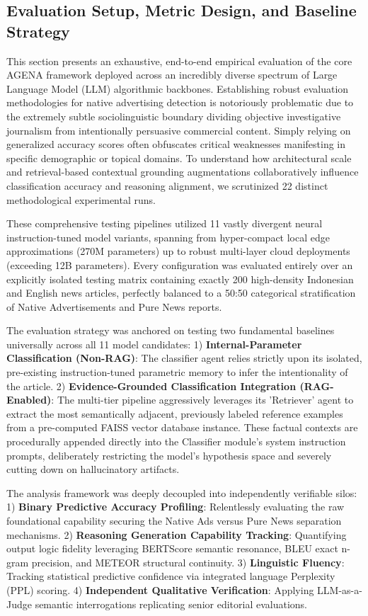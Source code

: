 \documentclass{ieeeaccess}
\begin{document}
\subsection{Evaluation Setup, Metric Design, and Baseline Strategy}
This section presents an exhaustive, end-to-end empirical evaluation of the core AGENA framework deployed across an incredibly diverse spectrum of Large Language Model (LLM) algorithmic backbones. Establishing robust evaluation methodologies for native advertising detection is notoriously problematic due to the extremely subtle sociolinguistic boundary dividing objective investigative journalism from intentionally persuasive commercial content. Simply relying on generalized accuracy scores often obfuscates critical weaknesses manifesting in specific demographic or topical domains. To understand how architectural scale and retrieval-based contextual grounding augmentations collaboratively influence classification accuracy and reasoning alignment, we scrutinized 22 distinct methodological experimental runs. 

These comprehensive testing pipelines utilized 11 vastly divergent neural instruction-tuned model variants, spanning from hyper-compact local edge approximations (270M parameters) up to robust multi-layer cloud deployments (exceeding 12B parameters). Every configuration was evaluated entirely over an explicitly isolated testing matrix containing exactly 200 high-density Indonesian and English news articles, perfectly balanced to a 50:50 categorical stratification of Native Advertisements and Pure News reports.

The evaluation strategy was anchored on testing two fundamental baselines universally across all 11 model candidates:
1) \textbf{Internal-Parameter Classification (Non-RAG)}: The classifier agent relies strictly upon its isolated, pre-existing instruction-tuned parametric memory to infer the intentionality of the article.
2) \textbf{Evidence-Grounded Classification Integration (RAG-Enabled)}: The multi-tier pipeline aggressively leverages its 'Retriever' agent to extract the most semantically adjacent, previously labeled reference examples from a pre-computed FAISS vector database instance. These factual contexts are procedurally appended directly into the Classifier module's system instruction prompts, deliberately restricting the model's hypothesis space and severely cutting down on hallucinatory artifacts.

The analysis framework was deeply decoupled into independently verifiable silos: 
1) \textbf{Binary Predictive Accuracy Profiling}: Relentlessly evaluating the raw foundational capability securing the Native Ads versus Pure News separation mechanisms.
2) \textbf{Reasoning Generation Capability Tracking}: Quantifying output logic fidelity leveraging BERTScore semantic resonance, BLEU exact n-gram precision, and METEOR structural continuity.
3) \textbf{Linguistic Fluency}: Tracking statistical predictive confidence via integrated language Perplexity (PPL) scoring.
4) \textbf{Independent Qualitative Verification}: Applying LLM-as-a-Judge semantic interrogations replicating senior editorial evaluations.
\end{document}
